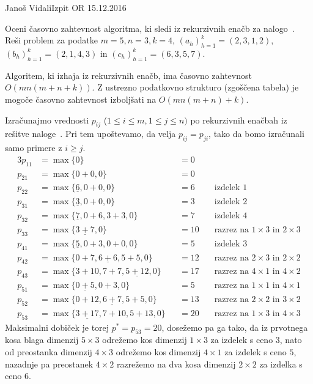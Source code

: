 \begin{naloga}{Janoš Vidali}{Izpit OR 15.12.2016}
\begin{vprasanje}
Oceni časovno zahtevnost algoritma,
ki sledi iz rekurzivnih enačb za nalogo~\nal[blago].
Reši problem za podatke $m = 5, n = 3, k = 4$,
$(a_h)_{h=1}^k = (2, 3, 1, 2)$, $(b_h)_{h=1}^k = (2, 1, 4, 3)$
in $(c_h)_{h=1}^k = (6, 3, 5, 7)$.
\end{vprasanje}

\begin{odgovor}
Algoritem, ki izhaja iz rekurzivnih enačb,
ima časovno zahtevnost $O(mn(m + n + k))$.
Z ustrezno podatkovno strukturo (zgoščena tabela)
je mogoče časovno zahtevnost izboljšati na $O(mn(m + n) + k)$.

Izračunajmo vrednosti $p_{ij}$ ($1 \le i \le m, 1 \le j \le n)$
po rekurzivnih enačbah iz rešitve naloge~\res[blago].
Pri tem upoštevamo, da velja $p_{ij} = p_{ji}$,
tako da bomo izračunali samo primere z $i \ge j$.
\begin{alignat*}{3}
p_{11} &= \max\{0\} &&= 0 \\
p_{21} &= \max\{0 + 0, 0\} &&= 0 \\
p_{22} &= \max\{\underline{6}, 0 + 0, 0\} &&= 6 &\quad \text{izdelek $1$} \\
p_{31} &= \max\{\underline{3}, 0 + 0, 0\} &&=3 &\quad \text{izdelek $2$} \\
p_{32} &= \max\{\underline{7}, 0 + 6, 3 + 3, 0\} &&=7 &\quad \text{izdelek $4$} \\
p_{33} &= \max\{\underline{3 + 7}, 0\} &&= 10 &\quad \text{razrez na $1 \times 3$ in $2 \times 3$} \\
p_{41} &= \max\{\underline{5}, 0 + 3, 0 + 0, 0\} &&=5 &\quad \text{izdelek $3$} \\
p_{42} &= \max\{0 + 7, \underline{6 + 6}, 5 + 5, 0\} &&= 12 &\quad \text{razrez na $2 \times 3$ in $2 \times 2$} \\
p_{43} &= \max\{3 + 10, 7 + 7, \underline{5 + 12}, 0\} &&= 17 &\quad \text{razrez na $4 \times 1$ in $4 \times 2$} \\
p_{51} &= \max\{\underline{0 + 5}, 0 + 3, 0\} &&=5 &\quad \text{razrez na $1 \times 1$ in $4 \times 1$} \\
p_{52} &= \max\{0 + 12, \underline{6 + 7}, 5 + 5, 0\} &&= 13 &\quad \text{razrez na $2 \times 2$ in $3 \times 2$} \\
p_{53} &= \max\{\underline{3 + 17}, 7 + 10, 5 + 13, 0\} &&= 20 &\quad \text{razrez na $1 \times 3$ in $4 \times 3$}
\end{alignat*}
Maksimalni dobiček je torej $p^* = p_{53} = 20$, dosežemo pa ga tako,
da iz prvotnega kosa blaga dimenzij $5 \times 3$
odrežemo kos dimenzij $1 \times 3$ za izdelek s ceno $3$,
nato od preostanka dimenzij $4 \times 3$
odrežemo kos dimenzij $4 \times 1$ za izdelek s ceno $5$,
nazadnje pa preostanek $4 \times 2$
razrežemo na dva kosa dimenzij $2 \times 2$ za izdelka s ceno $6$.
\end{odgovor}
\end{naloga}
